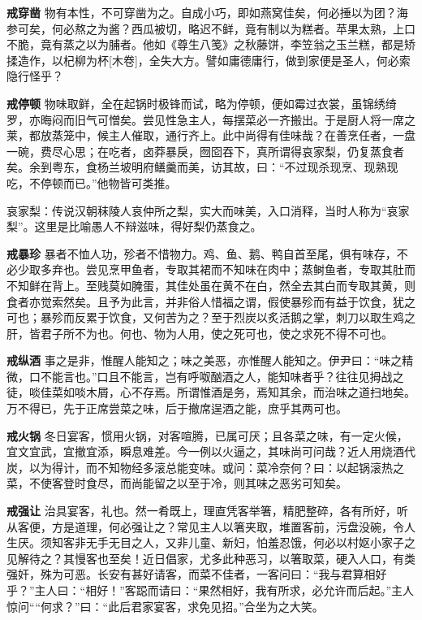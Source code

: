 \documentclass[]{article}
\begin{document}
\textbf{戒穿凿}
物有本性，不可穿凿为之。自成小巧，即如燕窝佳矣，何必捶以为团？海参可矣，何必熬之为酱？西瓜被切，略迟不鲜，竟有制以为糕者。苹果太熟，上口不脆，竟有蒸之以为脯者。他如《尊生八笺》之秋藤饼，李笠翁之玉兰糕，都是矫揉造作，以杞柳为杯{[}木卷{]}，全失大方。譬如庸德庸行，做到家便是圣人，何必索隐行怪乎？

\textbf{戒停顿}
物味取鲜，全在起锅时极锋而试，略为停顿，便如霉过衣裳，虽锦绣绮罗，亦晦闷而旧气可憎矣。尝见性急主人，每摆菜必一齐搬出。于是厨人将一席之莱，都放蒸笼中，候主人催取，通行齐上。此中尚得有佳味哉？在善烹任者，一盘一碗，费尽心思；在吃者，卤莽暴戾，囫囵吞下，真所谓得哀家梨，仍复蒸食者矣。余到粤东，食杨兰坡明府鳝羹而美，访其故，曰：``不过现杀现烹、现熟现吃，不停顿而已。''他物皆可类推。

哀家梨：传说汉朝秣陵人哀仲所之梨，实大而味美，入口消释，当时人称为``哀家梨''。这里是比喻愚人不辩滋味，得好梨仍蒸食之。

\textbf{戒暴珍}
暴者不恤人功，殄者不惜物力。鸡、鱼、鹅、鸭自首至尾，俱有味存，不必少取多弃也。尝见烹甲鱼者，专取其裙而不知味在肉中；蒸鲥鱼者，专取其肚而不知鲜在背上。至贱莫如腌蛋，其佳处虽在黄不在白，然全去其白而专取其黄，则食者亦觉索然矣。且予为此言，并非俗人惜福之谓，假使暴殄而有益于饮食，犹之可也；暴殄而反累于饮食，又何苦为之？至于烈炭以炙活鹅之掌，刺刀以取生鸡之肝，皆君子所不为也。何也、物为人用，使之死可也，使之求死不得不可也。

\textbf{戒纵酒}
事之是非，惟醒人能知之；味之美恶，亦惟醒人能知之。伊尹曰：``味之精微，口不能言也。''口且不能言，岂有呼呶酗酒之人，能知味者乎？往往见拇战之徒，啖佳菜如啖木屑，心不存焉。所谓惟酒是务，焉知其余，而治味之道扫地矣。万不得已，先于正席尝菜之味，后于撤席逞酒之能，庶乎其两可也。

\textbf{戒火锅}
冬日宴客，惯用火锅，对客喧腾，已属可厌；且各菜之味，有一定火候，宜文宜武，宜撤宜添，瞬息难差。今一例以火逼之，其味尚可问哉？近人用烧酒代炭，以为得计，而不知物经多滚总能变味。或问：菜冷奈何？曰：以起锅滚热之菜，不使客登时食尽，而尚能留之以至于冷，则其味之恶劣可知矣。

\textbf{戒强让}
治具宴客，礼也。然一肴既上，理直凭客举箸，精肥整碎，各有所好，听从客便，方是道理，何必强让之？常见主人以箸夹取，堆置客前，污盘没碗，令人生厌。须知客非无手无目之人，又非儿童、新妇，怕羞忍饿，何必以村妪小家子之见解待之？其慢客也至矣！近日倡家，尤多此种恶习，以箸取菜，硬入人口，有类强奸，殊为可恶。长安有甚好请客，而菜不佳者，一客问曰：``我与君算相好乎？''主人曰：``相好！''客跽而请曰：``果然相好，我有所求，必允许而后起。''主人惊问````何求？''曰：``此后君家宴客，求免见招。''合坐为之大笑。
\end{document}
